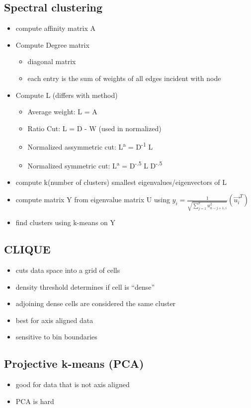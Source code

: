 \documentclass[11pt]{article}
\begin{document}
\subsection*{Spectral clustering}
\label{sec:org14b56c2}
\begin{itemize}
\item compute affinity matrix A
\item Compute Degree matrix
\begin{itemize}
\item diagonal matrix
\item each entry is the sum of weights of all edges incident with node
\end{itemize}
\item Compute L (differs with method)
\begin{itemize}
\item Average weight: L = A
\item Ratio Cut: L = D - W (used in normalized)
\item Normalized assymmetric cut: L\textsuperscript{a} = D\textsuperscript{-1} L
\item Normalized symmetric cut: L\textsuperscript{a} = D\textsuperscript{-.5} L D\textsuperscript{-.5}
\end{itemize}
\item compute k(number of clusters) smallest eigenvalues/eigenvectors of L
\item compute matrix Y from eigenvalue matrix U using \(y_i =
  \frac{1}{\sqrt{\sum^k_{j=1}u^2_{n-j+1, i}}}(\vec{u_i}^T)\)
\item find clusters using k-means on Y
\end{itemize}
\subsection*{CLIQUE}
\label{sec:org5544234}
\begin{itemize}
\item cuts data space into a grid of cells
\item density threshold determines if cell is ``dense''
\item adjoining dense cells are considered the same cluster
\item best for axis aligned data
\item sensitive to bin boundaries
\end{itemize}
\subsection*{Projective k-means (PCA)}
\label{sec:orgb0ffa65}
\begin{itemize}
\item good for data that is not axis aligned
\item PCA is hard
\end{itemize}
\end{document}
